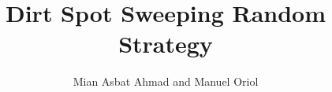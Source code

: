 \documentclass[conference]{IEEEtran}
\begin{document}
\title{Dirt Spot Sweeping Random Strategy}
\author{Mian Asbat Ahmad and Manuel Oriol}
\maketitle
\vspace*{0\baselineskip}
\end{document}
